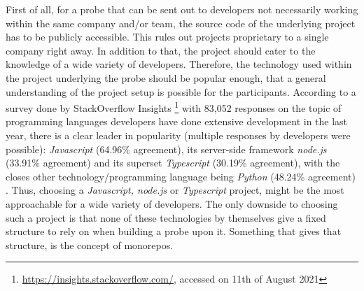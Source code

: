 First of all, for a probe that can be sent out to developers not necessarily working within the same company and/or team, the source code of the underlying project has to be publicly accessible. This rules out projects proprietary to a single company right away. In addition to that, the project should cater to the knowledge of a wide variety of developers. Therefore, the technology used within the project underlying the probe should be popular enough, that a general understanding of the project setup is possible for the participants. According to a survey done by StackOverflow Insights \footnote{\url{https://insights.stackoverflow.com/}, accessed on 11th of August 2021} with 83,052 responses on the topic of programming languages developers have done extensive development in the last year, there is a clear leader in popularity (multiple responses by developers were possible): \textit{Javascript} (64.96\% agreement), its server-side framework \textit{node.js} (33.91\% agreement) and its superset \textit{Typescript} (30.19\% agreement), with the closes other technology/programming language being \textit{Python} (48.24\% agreement) \cite{so2021}. Thus, choosing a \textit{Javascript, node.js} or \textit{Typescript} project, might be the most approachable for a wide variety of developers. The only downside to choosing such a project is that none of these technologies by themselves give a fixed structure to rely on when building a probe upon it. Something that gives that structure, is the concept of monorepos.

